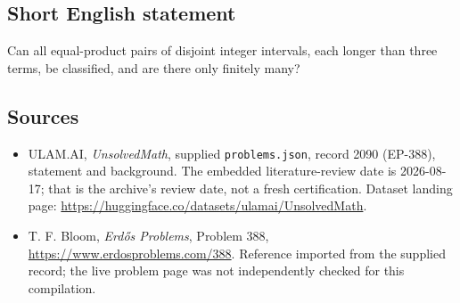 \documentclass[11pt,a4paper]{article}
\begin{document}
\subsection{Short English statement}

Can all equal-product pairs of disjoint integer intervals, each longer than three terms, be classified, and are there only finitely many?

\subsection{Sources}

{\small

\begin{itemize}

\item[\hypertarget{source:2090:1}{S1}] ULAM.AI, \emph{UnsolvedMath}, supplied \texttt{problems.json}, record 2090 (EP-388), statement and background. The embedded literature-review date is 2026-08-17; that is the archive’s review date, not a fresh certification. Dataset landing page: \url{https://huggingface.co/datasets/ulamai/UnsolvedMath}.

\item[\hypertarget{source:2090:2}{S2}] T. F. Bloom, \emph{Erdős Problems}, Problem 388, \url{https://www.erdosproblems.com/388}. Reference imported from the supplied record; the live problem page was not independently checked for this compilation.

\end{itemize}

}

\label{end:2090}
\end{document}
